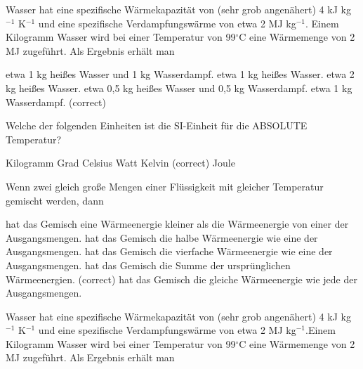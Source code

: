 \documentclass[11pt]{exam}
\begin{document}
\setlength{\voffset}{-0.5in}
\setlength{\headsep}{5pt}

\hspace{2mm}
 \hspace{5mm}
\vspace{4mm}

\begin{questions}

\question Wasser hat eine spezifische Wärmekapazität von (sehr grob angenähert) 4 kJ kg\(^{-1}\) K\(^{-1}\) und eine spezifische Verdampfungswärme von etwa 2 MJ kg\(^{-1}\). Einem Kilogramm Wasser wird bei einer Temperatur von 99\(^\circ\)C eine Wärmemenge von 2 MJ zugeführt. Als Ergebnis erhält man

\begin{choices}
	\choice etwa 1 kg heißes Wasser und 1 kg Wasserdampf.
	\choice etwa 1 kg heißes Wasser.
	\choice etwa 2 kg heißes Wasser.
	\choice etwa 0,5 kg heißes Wasser und 0,5 kg Wasserdampf.
	\choice etwa 1 kg Wasserdampf. (correct)
\end{choices}

\vspace{3mm}\question Welche der folgenden Einheiten ist die SI-Einheit für die ABSOLUTE Temperatur?

\begin{choices}
	\choice Kilogramm
	\choice Grad Celsius
	\choice Watt
	\choice Kelvin (correct)
	\choice Joule
\end{choices}

\vspace{3mm}\question Wenn zwei gleich große Mengen einer Flüssigkeit mit gleicher Temperatur gemischt werden, dann

\begin{choices}
	\choice hat das Gemisch eine Wärmeenergie kleiner als die Wärmeenergie von einer der Ausgangsmengen.
	\choice hat das Gemisch die halbe Wärmeenergie wie eine der Ausgangsmengen.
	\choice hat das Gemisch die vierfache Wärmeenergie wie eine der Ausgangsmengen.
	\choice hat das Gemisch die Summe der ursprünglichen Wärmeenergien. (correct)
	\choice hat das Gemisch die gleiche Wärmeenergie wie jede der Ausgangsmengen.
\end{choices}

\vspace{3mm}\question Wasser hat eine spezifische Wärmekapazität von (sehr grob angenähert) 4 kJ kg\(^{-1}\) K\(^{-1}\) und eine spezifische Verdampfungswärme von etwa 2 MJ kg\(^{-1}\).Einem Kilogramm Wasser wird bei einer Temperatur von 99\(^\circ\)C eine Wärmemenge von 2 MJ zugeführt. Als Ergebnis erhält man


\end{questions}
\end{document}
